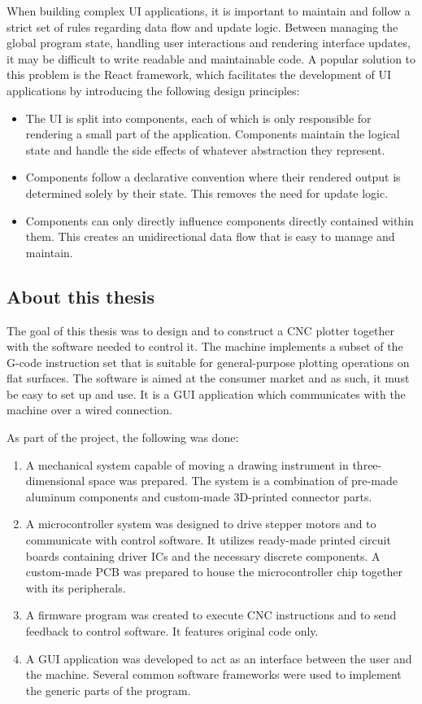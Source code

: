 When building complex UI applications, it is important to maintain and follow
a strict set of rules regarding data flow and update logic. Between managing
the global program state, handling user interactions and rendering interface
updates, it may be difficult to write readable and maintainable code. A popular
solution to this problem is the React framework, which facilitates the
development of UI applications by introducing the following design principles:
\begin{itemize}
    \item The UI is split into components, each of which is only responsible
    for rendering a small part of the application. Components maintain the
    logical state and handle the side effects of whatever abstraction they
    represent.
    \item Components follow a declarative convention where their rendered
    output is determined solely by their state. This removes the need for
    update logic.
    \item Components can only directly influence components directly contained
    within them. This creates an unidirectional data flow that is easy to manage
    and maintain.
\end{itemize}

\subsection{About this thesis}

The goal of this thesis was to design and to construct a CNC plotter together
with the software needed to control it. The machine implements a subset of the
G-code instruction set that is suitable for general-purpose plotting operations
on flat surfaces. The software is aimed at the consumer market and as such, it
must be easy to set up and use. It is a GUI application which communicates with
the machine over a wired connection.

As part of the project, the following was done:
\begin{enumerate}
    \item A mechanical system capable of moving a drawing instrument in
    three-dimensional space was prepared. The system is a combination of
    pre-made aluminum components and custom-made 3D-printed connector parts.
    \item A microcontroller system was designed to drive stepper motors and to
    communicate with control software. It utilizes ready-made printed circuit
    boards containing driver ICs and the necessary discrete components. A
    custom-made PCB was prepared to house the microcontroller chip together
    with its peripherals.
    \item A firmware program was created to execute CNC instructions and to send
    feedback to control software. It features original code only.
    \item A GUI application was developed to act as an interface between the
    user and the machine. Several common software frameworks were used to
    implement the generic parts of the program.
\end{enumerate}

